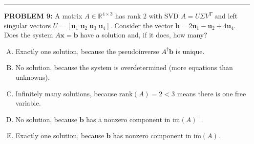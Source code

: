 \documentclass[12pt]{amsart}
\newcommand{\divider}{
  \vspace{-1em} %
  \noindent
  \raisebox{-0.15ex}{\textbullet}%
  \hspace{0.5em}%
  \rule[0.5ex]{0.95\textwidth}{1.0pt}%
  \hspace{0.5em}%
  \raisebox{-0.15ex}{\textbullet}%
  \vspace{0em} %
}
\begin{document}
%

\divider


{\bf PROBLEM 9:}
%
A matrix $A \in \mathbb{R}^{4 \times 3}$ has rank 2 with SVD $A = U\Sigma V^T$ and left singular vectors $U = [\mathbf{u}_1 \; \mathbf{u}_2 \; \mathbf{u}_3 \; \mathbf{u}_4]$.
Consider the vector $\mathbf{b} = 2\mathbf{u}_1 - \mathbf{u}_2 + 4\mathbf{u}_4$. 
Does the system $A\mathbf{x} = \mathbf{b}$ have a solution and, if it does, how many?

\begin{enumerate}[(A)]
\item Exactly one solution, because the pseudoinverse $A^\dagger\mathbf{b}$ is unique.
\item No solution, because the system is overdetermined (more equations than unknowns).
\item Infinitely many solutions, because $\mathrm{rank}(A) = 2 < 3$ means there is one free variable.
\item No solution, because $\mathbf{b}$ has a nonzero component in $\mathrm{im}(A)^\perp$.
\item Exactly one solution, because $\mathbf{b}$ has nonzero component in $\mathrm{im}(A)$.
\end{enumerate}
\end{document}
